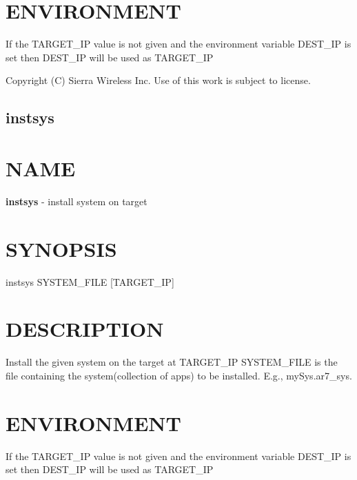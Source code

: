 \section*{E\+N\+V\+I\+R\+O\+N\+M\+E\+N\+T}

\begin{DoxyVerb}If the TARGET_IP value is not given and the environment variable DEST_IP
is set then DEST_IP will be used as TARGET_IP
\end{DoxyVerb}




 Copyright (C) Sierra Wireless Inc. Use of this work is subject to license. \hypertarget{toolsHost_instsys}{}\subsection{instsys}\label{toolsHost_instsys}
\section*{N\+A\+M\+E}

{\bfseries instsys} -\/ install system on target

\section*{S\+Y\+N\+O\+P\+S\+I\+S}

{\ttfamily instsys S\+Y\+S\+T\+E\+M\+\_\+\+F\+I\+L\+E \mbox{[}T\+A\+R\+G\+E\+T\+\_\+\+I\+P\mbox{]}}~\newline


\section*{D\+E\+S\+C\+R\+I\+P\+T\+I\+O\+N}

Install the given system on the target at T\+A\+R\+G\+E\+T\+\_\+\+I\+P S\+Y\+S\+T\+E\+M\+\_\+\+F\+I\+L\+E is the file containing the system(collection of apps) to be installed. E.\+g., \textquotesingle{}my\+Sys.\+ar7\+\_\+sys\textquotesingle{}.

\section*{E\+N\+V\+I\+R\+O\+N\+M\+E\+N\+T}

\begin{DoxyVerb}If the TARGET_IP value is not given and the environment variable DEST_IP
is set then DEST_IP will be used as TARGET_IP
\end{DoxyVerb}




